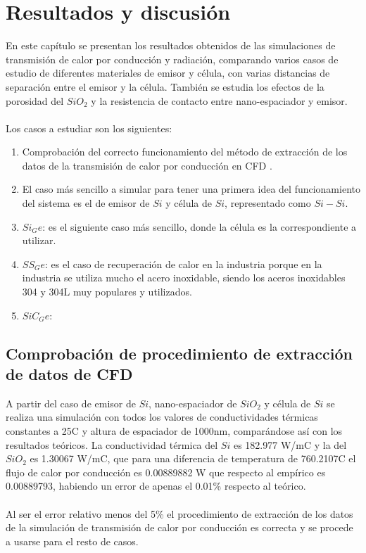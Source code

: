 \chapter{Resultados y discusión}

En este capítulo se presentan los resultados obtenidos de las simulaciones de transmisión de calor por conducción y radiación, comparando varios casos de estudio de diferentes materiales de emisor y célula, con varias distancias de separación entre el emisor y la célula. También se estudia los efectos de la porosidad del $SiO_2$ y la resistencia de contacto entre nano-espaciador y emisor.\\\\
Los casos a estudiar son los siguientes:
\begin{enumerate}
	\item Comprobación del correcto funcionamiento del método de extracción de los datos de la transmisión de calor por conducción en CFD \label{res:comprobacionCFD}.
	\item El caso más sencillo a simular para tener una primera idea del funcionamiento del sistema es el de emisor de $Si$ y célula de $Si$, representado como $Si-Si$.\label{res:caso_Si_Si}
	\item $Si_Ge$: es el siguiente caso más sencillo, donde la célula es la correspondiente a utilizar.\label{res:caso_Si_Ge}
	\item $SS_Ge$: es el caso de recuperación de calor en la industria porque en la industria se utiliza mucho el acero inoxidable, siendo los aceros inoxidables 304 y 304L muy populares y utilizados.\label{res:caso_SS_Ge}
	\item $SiC_Ge$: 
\end{enumerate}
\section{Comprobación de procedimiento de extracción de datos de CFD}
A partir del caso de emisor de $Si$, nano-espaciador de $SiO_2$ y célula de $Si$ se realiza una simulación con todos los valores de conductividades térmicas constantes a 25\textdegree C y altura de espaciador de 1000nm, comparándose así con los resultados teóricos. La conductividad térmica del $Si$ es 182.977 W/m\textdegree C y la del $SiO_2$ es 1.30067 W/m\textdegree C, que para una diferencia de temperatura de 760.2107\textdegree C el flujo de calor por conducción es 0.00889882 W que respecto al empírico es 0.00889793, habiendo un error de apenas el 0.01\% respecto al teórico.\\\\
Al ser el error relativo menos del 5\% el procedimiento de extracción de los datos de la simulación de transmisión de calor por conducción es correcta y se procede a usarse para el resto de casos.\\

